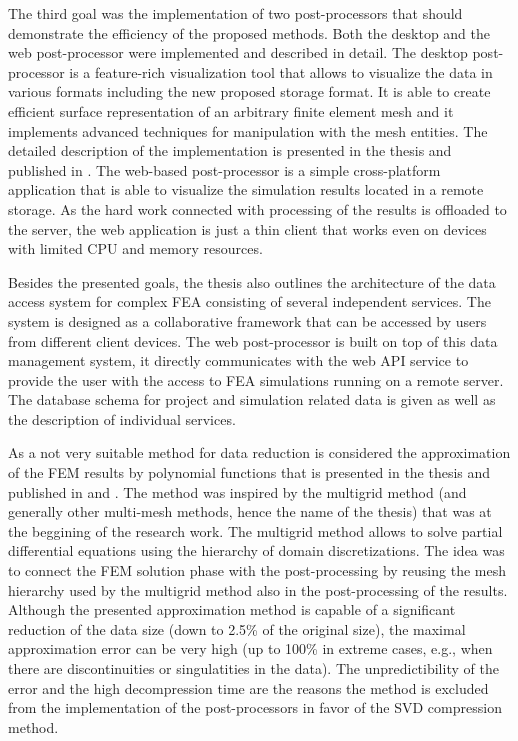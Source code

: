 The third goal was the implementation of two post-processors that should demonstrate the efficiency of the proposed methods. Both the desktop and the web post-processor were implemented and described in detail. The desktop post-processor is a feature-rich visualization tool that allows to visualize the data in various formats including the new proposed storage format. It is able to create efficient surface representation of an arbitrary finite element mesh and it implements advanced techniques for manipulation with the mesh entities. The detailed description of the implementation is presented in the thesis and published in \cite{Benes2015}. The web-based post-processor is a simple cross-platform application that is able to visualize the simulation results located in a remote storage. As the hard work connected with processing of the results is offloaded to the server, the web application is just a thin client that works even on devices with limited CPU and memory resources.

Besides the presented goals, the thesis also outlines the architecture of the data access system for complex FEA consisting of several independent services. The system is designed as a collaborative framework that can be accessed by users from different client devices. The web post-processor is built on top of this data management system, it directly communicates with the web API service to provide the user with the access to FEA simulations running on a remote server. The database schema for project and simulation related data is given as well as the description of individual services.

As a not very suitable method for data reduction is considered the approximation of the FEM results by polynomial functions that is presented in the thesis and published in \cite{Benes2016} and \cite{Benes2016Pollack}. The method was inspired by the multigrid method (and generally other multi-mesh methods, hence the name of the thesis) that was at the beggining of the research work. The multigrid method allows to solve partial differential equations using the hierarchy of domain discretizations. The idea was to connect the FEM solution phase with the post-processing by reusing the mesh hierarchy used by the multigrid method also in the post-processing of the results. Although the presented approximation method is capable of a significant reduction of the data size (down to 2.5\% of the original size), the maximal approximation error can be very high (up to 100\% in extreme cases, e.g., when there are discontinuities or singulatities in the data). The unpredictibility of the error and the high decompression time are the reasons the method is excluded from the implementation of the post-processors in favor of the SVD compression method.
